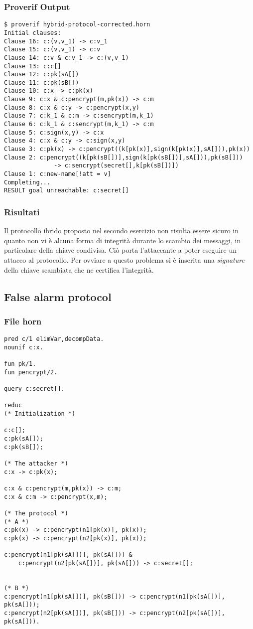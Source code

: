 \documentclass[11pt]{article}
\begin{document}
\subsubsection{Proverif Output}
\label{sec:org25abe7c}
\begin{verbatim}
$ proverif hybrid-protocol-corrected.horn
Initial clauses:
Clause 16: c:(v,v_1) -> c:v_1
Clause 15: c:(v,v_1) -> c:v
Clause 14: c:v & c:v_1 -> c:(v,v_1)
Clause 13: c:c[]
Clause 12: c:pk(sA[])
Clause 11: c:pk(sB[])
Clause 10: c:x -> c:pk(x)
Clause 9: c:x & c:pencrypt(m,pk(x)) -> c:m
Clause 8: c:x & c:y -> c:pencrypt(x,y)
Clause 7: c:k_1 & c:m -> c:sencrypt(m,k_1)
Clause 6: c:k_1 & c:sencrypt(m,k_1) -> c:m
Clause 5: c:sign(x,y) -> c:x
Clause 4: c:x & c:y -> c:sign(x,y)
Clause 3: c:pk(x) -> c:pencrypt((k[pk(x)],sign(k[pk(x)],sA[])),pk(x))
Clause 2: c:pencrypt((k[pk(sB[])],sign(k[pk(sB[])],sA[])),pk(sB[]))
              -> c:sencrypt(secret[],k[pk(sB[])])
Clause 1: c:new-name[!att = v]
Completing...
RESULT goal unreachable: c:secret[]
\end{verbatim}

\subsubsection{Risultati}
\label{sec:orgc8e2e10}
Il protocollo ibrido proposto nel secondo esercizio non risulta essere sicuro in quanto non vi è alcuna forma di integrità durante lo scambio dei messaggi, in particolare della chiave condivisa. Ciò porta l'attaccante a poter eseguire un attacco al protocollo. Per ovviare a questo problema si è inserita una \emph{signature} della chiave scambiata che ne certifica l'integrità.
\subsection{False alarm protocol}
\label{sec:org424a29e}
\subsubsection{File horn}
\label{sec:org51bc49f}
\begin{verbatim}
pred c/1 elimVar,decompData.
nounif c:x.

fun pk/1.
fun pencrypt/2.

query c:secret[].

reduc
(* Initialization *)

c:c[];
c:pk(sA[]);
c:pk(sB[]);

(* The attacker *)
c:x -> c:pk(x);

c:x & c:pencrypt(m,pk(x)) -> c:m;
c:x & c:m -> c:pencrypt(x,m);

(* The protocol *)
(* A *)
c:pk(x) -> c:pencrypt(n1[pk(x)], pk(x));
c:pk(x) -> c:pencrypt(n2[pk(x)], pk(x));

c:pencrypt(n1[pk(sA[])], pk(sA[])) &
    c:pencrypt(n2[pk(sA[])], pk(sA[])) -> c:secret[];


(* B *)
c:pencrypt(n1[pk(sA[])], pk(sB[])) -> c:pencrypt(n1[pk(sA[])], pk(sA[]));
c:pencrypt(n2[pk(sA[])], pk(sB[])) -> c:pencrypt(n2[pk(sA[])], pk(sA[])).
\end{verbatim}
\end{document}
